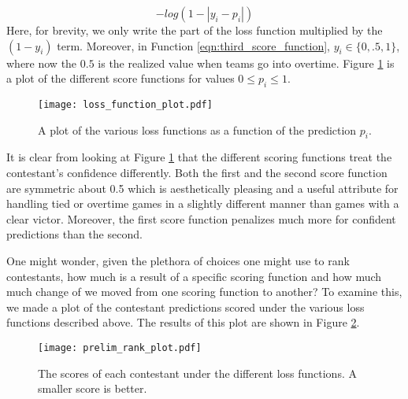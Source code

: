 \begin{equation}\label{eqn:third_score_function}
-log(1-|y_i-p_i|)
\end{equation} 
Here, for brevity, we only write the part of the loss function multiplied by the $(1-y_i)$ term. Moreover, in Function \ref{eqn:third_score_function}, $y_i \in \{0,.5,1\}$, where now the $0.5$ is the realized value when teams go into overtime. Figure \ref{fig:scoring_functions} is a plot of the different score functions for values $0\leq p_i \leq 1$.  


\begin{figure}[h]
\centering
\texttt{[image: loss\_function\_plot.pdf]}
\caption{A plot of the various loss functions as a function of the prediction $p_i$.  }
\label{fig:scoring_functions}
\end{figure}

It is clear from looking at Figure \ref{fig:scoring_functions} that the different scoring functions treat the contestant's confidence differently. Both the first and the second score function are symmetric about 0.5 which is aesthetically pleasing and a useful attribute for handling tied or overtime games in a slightly different manner than games with a clear victor. Moreover, the first score function penalizes much more for confident predictions than the second. 

One might wonder, given the plethora of choices one might use to rank contestants, how much is a result of a specific scoring function and how much much change of  we moved from one scoring function to another? To examine this, we made a plot of the contestant predictions scored under the various loss functions described above. The results of this plot are shown in Figure \ref{fig:score_rank_plot}. 

  \begin{figure}[h]
\centering
\texttt{[image: prelim\_rank\_plot.pdf]}
\caption{The scores of each contestant under the different loss functions. A smaller score is better.  }
\label{fig:score_rank_plot}
\end{figure}



